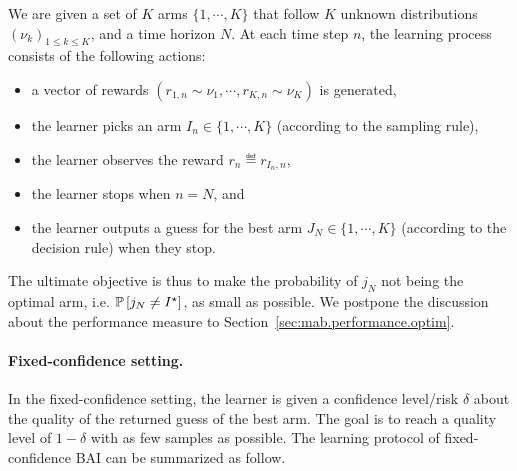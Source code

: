 \begin{definition}\label{def:mab.bai_budget}
\begin{leftbar}[defnbar]
	We are given a set of $K$ arms $\{1,\cdots,K\}$ that follow $K$ unknown distributions $(\nu_k)_{1 \leq k \leq K}$, and a time horizon $N$. At each time step $n$, the learning process consists of the following actions:
\begin{itemize}
	\item a vector of rewards $(r_{1,n} \sim \nu_1, \cdots, r_{K,n} \sim \nu_K)$ is generated,
	\item the learner picks an arm $I_n \in \{1,\cdots,K\}$ (according to the sampling rule),
	\item the learner observes the reward $r_n \eqdef r_{I_n, n}$,
	\item the learner stops when $n=N$, and
	\item the learner outputs a guess for the best arm $J_N \in \{1,\cdots,K\}$ (according to the decision rule) when they stop.
\end{itemize}
\end{leftbar}
\end{definition}

The ultimate objective is thus to make the probability of $j_N$ not being the optimal arm, i.e. $\mathbb{P}\left[j_N\neq I^\star\right]$, as small as possible. We postpone the discussion about the performance measure to Section~\ref{sec:mab.performance.optim}.

\paragraph{Fixed-confidence setting.}

In the fixed-confidence setting, the learner is given a confidence level/risk $\delta$ about the quality of the returned guess of the best arm. The goal is to reach a quality level of $1-\delta$ with as few samples as possible. The learning protocol of fixed-confidence BAI can be summarized as follow.

